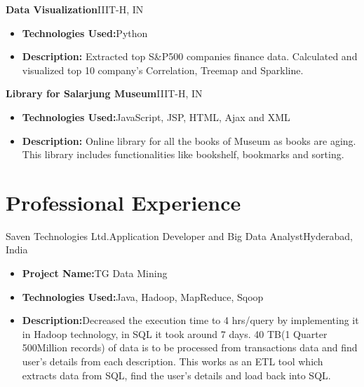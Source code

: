 \documentclass[11pt,a4paper,sans]{moderncv}        %
\begin{document}
\vspace{5pt}

\textbf{Data Visualization}\hfill{IIIT-H, IN}
\textit{}

\vspace{3pt}
\begin{itemize}
\item{\textbf{Technologies Used:}Python}
\item{\textbf{Description:} Extracted top S\&P500 companies finance data. Calculated and visualized top 10 company’s Correlation, Treemap and Sparkline.}
\end{itemize}

\vspace{5pt}

\textbf{Library for Salarjung Museum}\hfill{IIIT-H, IN}
\textit{}

\vspace{3pt}
\begin{itemize}
\item{\textbf{Technologies Used:}JavaScript, JSP, HTML, Ajax and XML}
\item{\textbf{Description:} Online library for all the books of Museum as books are aging. This library includes functionalities like bookshelf, bookmarks and sorting.}
\end{itemize}

\vspace{6pt}
\section{Professional Experience}
\vspace{6pt}

{Saven Technologies Ltd.}{Application Developer and Big Data Analyst}{Hyderabad, India}{}{
\vspace{3pt}
\begin{itemize}
\item{\textbf{Project Name:}TG Data Mining}
\item{\textbf{Technologies Used:}Java, Hadoop, MapReduce, Sqoop}
\item{\textbf{Description:}Decreased the execution time to 4 hrs/query by implementing it in Hadoop technology, in SQL it took around 7 days. 40 TB(1 Quarter ~ 500Million records) of data is to be processed from transactions data and find user's details from each description. This works as an ETL tool which extracts data from SQL, find the user's details and load back into SQL.}
\end{itemize}
}
\end{document}
